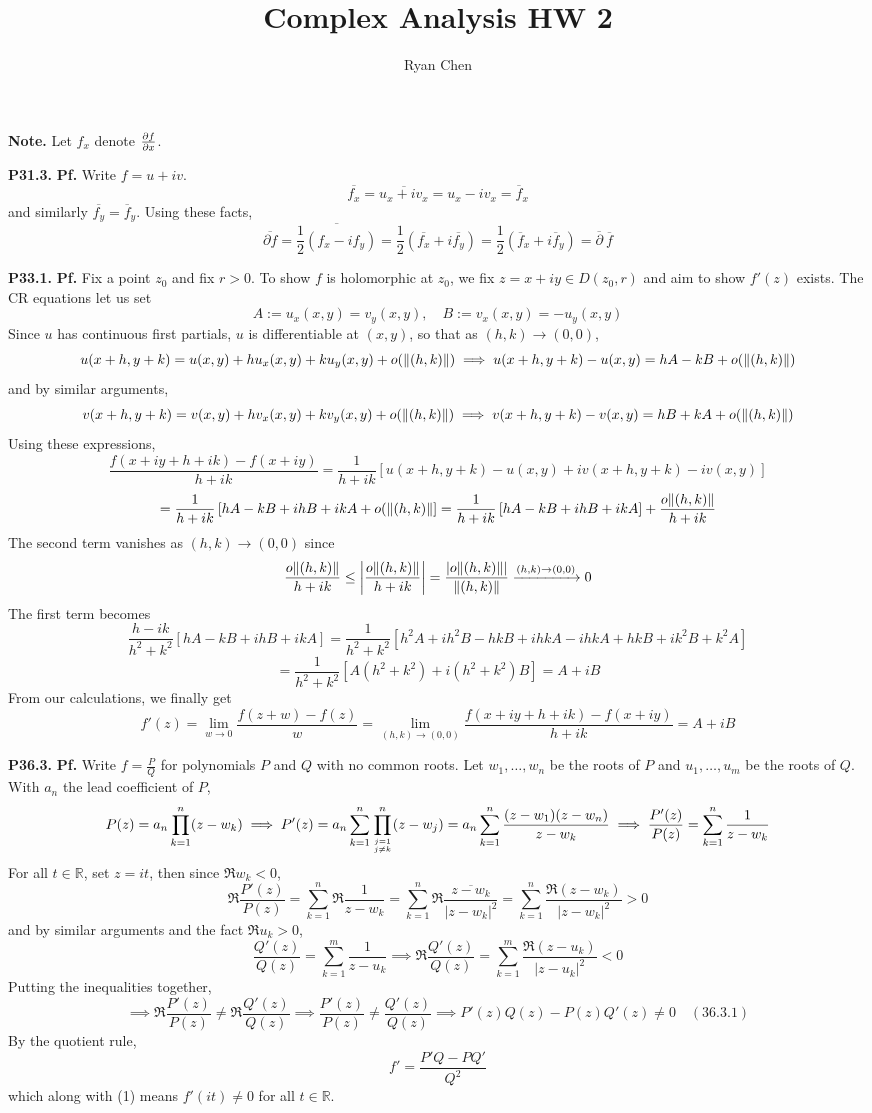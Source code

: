 \documentclass{article}
\title{Complex Analysis HW 2}
\author{Ryan Chen}
\def\mbb#1{\mathbb{#1}}
\def\tbf#1{\textbf{#1}}
\def\bR{\mbb{R}}
\newcommand{\sbr}[1]{\left[#1\right]}
\newcommand{\pf}{\tbf{Pf. }}
\newcommand{\imp}{\implies}
\newcommand{\sep}[1][.5cm]{\vspace{#1}}
\renewcommand{\bar}{\overline}
\begin{document}
	
\maketitle



\tbf{Note.} Let $f_x$ denote $\pdv{f}{x}$.
\sep



\tbf{P31.3.} \pf Write $f=u+iv$.
$$\bar{f_x} = \bar{u_x+iv_x} = u_x-iv_x = \bar f_x$$
and similarly $\bar{f_y}=\bar f_y$. Using these facts,
$$\bar{\partial f} = \bar{\frac12(f_x-if_y)} = \frac12(\bar{f_x}+i\bar{f_y}) = \frac12(\bar f_x+i\bar f_y) = \bar\partial~\bar f$$
\sep



\tbf{P33.1.} \pf Fix a point $z_0$ and fix $r>0$. To show $f$ is holomorphic at $z_0$, we fix $z=x+iy\in D(z_0,r)$ and aim to show $f'(z)$ exists. The CR equations let us set
$$A := u_x(x,y) = v_y(x,y),
\quad B := v_x(x,y) = -u_y(x,y)$$
Since $u$ has continuous first partials, $u$ is differentiable at $(x,y)$, so that as $(h,k)\to(0,0)$,
$$u(x+h,y+k) = u(x,y) + hu_x(x,y) + ku_y(x,y) + o(\norm{(h,k)})
\imp u(x+h,y+k) - u(x,y) =  hA - kB + o(\norm{(h,k)})$$
and by similar arguments,
$$v(x+h,y+k) = v(x,y) + hv_x(x,y) + kv_y(x,y) + o(\norm{(h,k)})
\imp v(x+h,y+k) - v(x,y) = hB + kA + o(\norm{(h,k)})$$
Using these expressions,
$$\frac{f(x+iy+h+ik) - f(x+iy)}{h+ik}
= \frac{1}{h+ik}\sbr{u(x+h,y+k) - u(x,y) + iv(x+h,y+k) - iv(x,y)}$$
$$= \frac{1}{h+ik}\sbr{hA - kB + ihB + ikA + o(\norm{(h,k)}}
= \frac{1}{h+ik}\sbr{hA - kB + ihB + ikA} + \frac{o{\norm{(h,k)}}}{h+ik}$$
The second term vanishes as $(h,k)\to(0,0)$ since
$$\frac{o{\norm{(h,k)}}}{h+ik} \le \abs{\frac{o{\norm{(h,k)}}}{h+ik}}
= \frac{\abs{o{\norm{(h,k)}}}}{\norm{(h,k)}}
\app[(h,k)][(0,0)] 0$$
The first term becomes
$$\frac{h-ik}{h^2+k^2}\sbr{hA - kB + ihB + ikA}
= \frac{1}{h^2+k^2}\sbr{h^2A + ih^2B - hkB + ihkA - ihkA + hkB + ik^2B + k^2A}$$
$$= \frac{1}{h^2+k^2}\sbr{A(h^2+k^2) + i(h^2+k^2)B}
= A + iB$$
From our calculations, we finally get
$$f'(z) = \lim_{w\to0}\frac{f(z+w)-f(z)}{w}
= \lim_{(h,k)\to(0,0)}\frac{f(x+iy+h+ik) - f(x+iy)}{h+ik}
= A + iB$$
\sep



\tbf{P36.3.} \pf Write $f=\frac PQ$ for polynomials $P$ and $Q$ with no common roots. Let $w_1,\dots,w_n$ be the roots of $P$ and $u_1,\dots,u_m$ be the roots of $Q$. With $a_n$ the lead coefficient of $P$,
$$P(z) = a_n\prod_{k=1}^n (z-w_k)
\imp P'(z) = a_n\sum_{k=1}^n\prod_{j=1\atop j\ne k}^n(z-w_j)
= a_n\sum_{k=1}^n\frac{(z-w_1)(z-w_n)}{z-w_k}
\imp \frac{P'(z)}{P(z)} = \sum_{k=1}^n\frac{1}{z-w_k}$$
For all $t\in\bR$, set $z=it$, then since $\Re w_k<0$,
$$\Re \frac{P'(z)}{P(z)} = \sum_{k=1}^n \Re\frac1{z-w_k}
= \sum_{k=1}^n \Re\frac{\bar{z-w_k}}{|z-w_k|^2}
= \sum_{k=1}^n\frac{\Re(z-w_k)}{|z-w_k|^2}
> 0$$
and by similar arguments and the fact $\Re u_k>0$,
$$\frac{Q'(z)}{Q(z)} = \sum_{k=1}^m\frac1{z-u_k}
\imp \Re\frac{Q'(z)}{Q(z)} = \sum_{k=1}^m\frac{\Re(z-u_k)}{|z-u_k|^2}
< 0$$
Putting the inequalities together,
$$\imp \Re \frac{P'(z)}{P(z)} \ne \Re\frac{Q'(z)}{Q(z)}
\imp \frac{P'(z)}{P(z)} \ne \frac{Q'(z)}{Q(z)}
\imp P'(z)Q(z)-P(z)Q'(z) \ne 0\quad (36.3.1)$$
By the quotient rule,
$$f'=\frac{P'Q-PQ'}{Q^2}$$
which along with (1) means $f'(it)\ne0$ for all $t\in\bR$.
\end{document}

